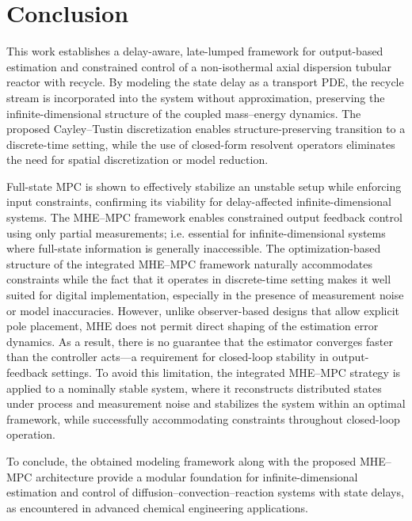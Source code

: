 \section{Conclusion} \label{sec:3_conclusion}

This work establishes a delay-aware, late-lumped framework for output-based estimation and constrained control of a non-isothermal axial dispersion tubular reactor with recycle. By modeling the state delay as a transport PDE, the recycle stream is incorporated into the system without approximation, preserving the infinite-dimensional structure of the coupled mass--energy dynamics. The proposed Cayley--Tustin discretization enables structure-preserving transition to a discrete-time setting, while the use of closed-form resolvent operators eliminates the need for spatial discretization or model reduction.

Full-state MPC is shown to effectively stabilize an unstable setup while enforcing input constraints, confirming its viability for delay-affected infinite-dimensional systems. The MHE--MPC framework enables constrained output feedback control using only partial measurements; i.e. essential for infinite-dimensional systems where full-state information is generally inaccessible. The optimization-based structure of the integrated MHE--MPC framework naturally accommodates constraints while the fact that it operates in discrete-time setting makes it well suited for digital implementation, especially in the presence of measurement noise or model inaccuracies. However, unlike observer-based designs that allow explicit pole placement, MHE does not permit direct shaping of the estimation error dynamics. As a result, there is no guarantee that the estimator converges faster than the controller acts---a requirement for closed-loop stability in output-feedback settings. To avoid this limitation, the integrated MHE--MPC strategy is applied to a nominally stable system, where it reconstructs distributed states under process and measurement noise and stabilizes the system within an optimal framework, while successfully accommodating constraints throughout closed-loop operation.

To conclude, the obtained modeling framework along with the proposed MHE--MPC architecture provide a modular foundation for infinite-dimensional estimation and control of diffusion--convection--reaction systems with state delays, as encountered in advanced chemical engineering applications.